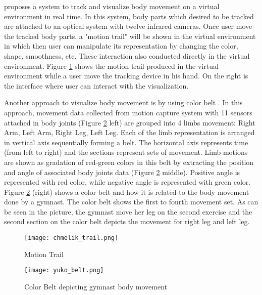 \cite{chmelik} proposes a system to track and visualize body movement on a virtual environment in real time. In this system, body parts  which desired to be tracked are attached to an optical system with twelve infrared cameras. Once user move the tracked body parts, a "motion trail" will be shown in the virtual environment in which then user can manipulate its representation by changing the color, shape, smoothness, etc. These interaction also conducted directly in the virtual environment. Figure \ref{motion_trail} \cite{chmelik} shows the motion trail produced in the virtual environment while a user move the tracking device in his hand. On the right is the interface where user can interact with the visualization.

Another approach to visualize body movement is by using color belt \cite{yuko}. In this approach, movement data collected from motion capture system with 11 sensors attached in body joints (Figure \ref{color_belt} left) are grouped into 4 limbs movement: Right Arm, Left Arm, Right Leg, Left Leg. Each of the limb representation is arranged in vertical axis sequentially forming a belt. The horizontal axis represents time (from left to right) and the sections represent sets of movement. Limb motions are shown as gradation of red-green colors in this belt by extracting the position and angle of associated body joints data (Figure \ref{color_belt} middle). Positive angle is represented with red color, while negative angle is represented with green color. Figure \ref{color_belt} (right) shows a color belt and how it is related to the body movement done by a gymnast. The color belt shows the first to fourth movement set. As can be seen in the picture, the gymnast move her leg on the second exercise and the second section on the color belt depicts the movement for right leg and left leg.

\begin{figure}
\centering
\texttt{[image: chmelik\_trail.png]}
\caption{Motion Trail}
\label{motion_trail}
\end{figure}

\begin{figure}
\centering
\texttt{[image: yuko\_belt.png]}
\caption{Color Belt depicting gymnast body movement}
\label{color_belt}
\end{figure}

